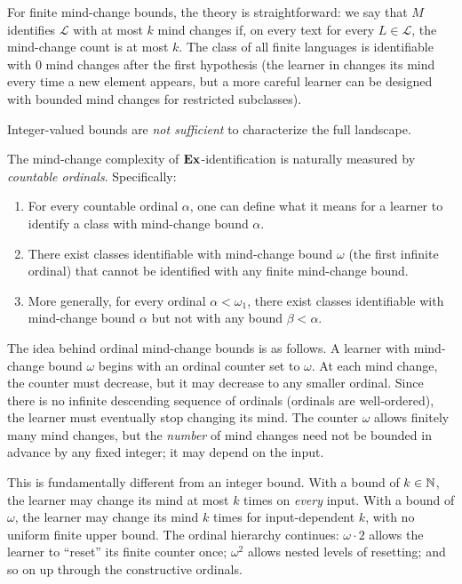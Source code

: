 For finite mind-change bounds, the theory is straightforward: we say that $M$ identifies $\mathcal{L}$ with at most $k$ mind changes if, on every text for every $L \in \mathcal{L}$, the mind-change count is at most $k$. The class of all finite languages is identifiable with 0 mind changes after the first hypothesis (the learner in  changes its mind every time a new element appears, but a more careful learner can be designed with bounded mind changes for restricted subclasses).

Integer-valued bounds are \emph{not sufficient} to characterize the full landscape.

\begin{thm}
\label{thm:mind-change-ordinal}
The mind-change complexity of $\mathbf{Ex}$-identification is naturally measured by \emph{countable ordinals}. Specifically:
\begin{enumerate}[label=(\roman*),leftmargin=*]
\item For every countable ordinal $\alpha$, one can define what it means for a learner to identify a class with mind-change bound $\alpha$.
\item There exist classes identifiable with mind-change bound $\omega$ (the first infinite ordinal) that cannot be identified with any finite mind-change bound.
\item More generally, for every ordinal $\alpha < \omega_1$, there exist classes identifiable with mind-change bound $\alpha$ but not with any bound $\beta < \alpha$.
\end{enumerate}
\end{thm}

The idea behind ordinal mind-change bounds is as follows. A learner with mind-change bound $\omega$ begins with an ordinal counter set to $\omega$. At each mind change, the counter must decrease, but it may decrease to any smaller ordinal. Since there is no infinite descending sequence of ordinals (ordinals are well-ordered), the learner must eventually stop changing its mind. The counter $\omega$ allows finitely many mind changes, but the \emph{number} of mind changes need not be bounded in advance by any fixed integer; it may depend on the input.

This is fundamentally different from an integer bound. With a bound of $k \in \mathbb{N}$, the learner may change its mind at most $k$ times on \emph{every} input. With a bound of $\omega$, the learner may change its mind $k$ times for input-dependent $k$, with no uniform finite upper bound. The ordinal hierarchy continues: $\omega \cdot 2$ allows the learner to ``reset'' its finite counter once; $\omega^2$ allows nested levels of resetting; and so on up through the constructive ordinals.

